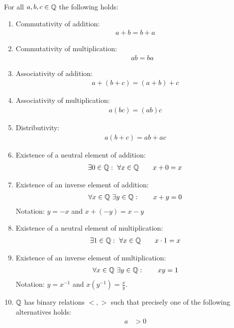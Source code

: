 \begin{pr}
	For all $a,b,c \in \mathbb Q$ the following holds:
	\begin{enumerate}
		\item
		Commutativity of addition:
		\begin{align*}
		 a+b = b+a
		\end{align*}
		\item
		Commutativity of multiplication:
		\begin{align*}
		\qquad ab = ba
		\end{align*}
		\item
		Associativity of addition:
		\begin{align*}
		a+(b+c) = (a+b)+c
		\end{align*}
		\item
		Associativity of multiplication:
		\begin{align*}
		a(bc) = (ab)c
		\end{align*}
		\item
		Distributivity:
		\begin{align*}
		a(b+c) = ab+ ac
		\end{align*}
		\item
		Existence of a neutral element of addition:
		\begin{align*}
		\exists 0 \in \mathbb Q: ~\forall x \in \mathbb Q \qquad x+ 0 = x
		\end{align*}
		\item
		Existence of an inverse element of addition:
		\begin{align*}
		\forall x \in \mathbb Q ~\exists y \in \mathbb Q: \qquad x+ y = 0
		\end{align*}
		Notation: $y = -x$ and $x+(-y) = x-y$
		\item
		Existence of a neutral element of multiplication:
		\begin{align*}
		\exists 1 \in \mathbb Q: ~\forall x \in \mathbb Q \qquad x \cdot  1 = x
		\end{align*}
		\item
		Existence of an inverse element of multiplication:
		\begin{align*}
		\forall x \in \mathbb Q ~ \exists y \in \mathbb Q: \qquad x y = 1
		\end{align*}
		Notation: $y = x^{-1}$ and $x(y^{-1}) = \frac x y$.
		\item
		$\mathbb Q$ has binary relations $<, >$ such that precisely one of the following alternatives holds:
		\begin{align*}
		a & > 0 \\

\end{align*}
\end{enumerate}
\end{pr}
